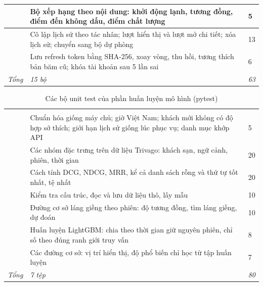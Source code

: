 \begin{rtable}
\begin{longtable}{|L{5.4cm}|L{7.9cm}|C{1.4cm}|}
 & Bộ xếp hạng theo nội dung: khởi động lạnh, tương đồng, điểm đến không dấu, điểm chất lượng & 5 \\ \hline
{} & Cô lập lịch sử theo tác nhân; lượt hiển thị và lượt mở chi tiết; xóa lịch sử; chuyển sang bộ dự phòng & 13 \\ \hline
{} & Lưu refresh token bằng SHA-256, xoay vòng, thu hồi, tương thích bản băm cũ; khóa tài khoản sau 5 lần sai & 6 \\ \hline
\textit{Tổng} & \textit{15 bộ} & \textit{63} \\ \hline
\end{longtable}
\end{rtable}

\begin{rtable}
\begin{longtable}{|L{5.4cm}|L{7.9cm}|C{1.4cm}|}
\caption{Các bộ unit test của phần huấn luyện mô hình (pytest)}\label{tab:unit-pytest}\\
\hline
{} &  &  \\ \hline
\endfirsthead
\hline
{} &  &  \\ \hline
\endhead
{} & Chuẩn hóa giống máy chủ; giờ Việt Nam; khách mới không có độ hợp sở thích; giới hạn lịch sử giống lúc phục vụ; danh mục khớp API & 5 \\ \hline
{} & Các nhóm đặc trưng trên dữ liệu Trivago: khách sạn, ngữ cảnh, phiên, thời gian & 20 \\ \hline
{} & Cách tính DCG, NDCG, MRR, kể cả danh sách rỗng và thứ tự tốt nhất, tệ nhất & 20 \\ \hline
{} & Kiểm tra cấu trúc, đọc và lưu dữ liệu thô, lấy mẫu & 10 \\ \hline
{} & Đường cơ sở láng giềng theo phiên: độ tương đồng, tìm láng giềng, dự đoán & 10 \\ \hline
{} & Huấn luyện LightGBM: chia theo thời gian giữ nguyên phiên, chỉ số theo đúng ranh giới truy vấn & 8 \\ \hline
{} & Các đường cơ sở: vị trí hiển thị, độ phổ biến chỉ học từ tập huấn luyện & 7 \\ \hline
\textit{Tổng} & \textit{7 tệp} & \textit{80} \\ \hline
\end{longtable}
\end{rtable}

